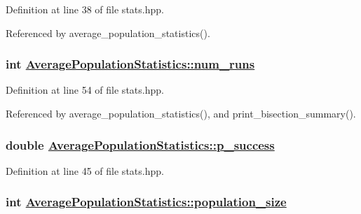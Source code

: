 Definition at line 38 of file stats.hpp.

Referenced by average\_\-population\_\-statistics().\hypertarget{struct_average_population_statistics_e4f9ec7ed6bc9f924fa740a141478797}{
\subsubsection[num\_\-runs]{\setlength{\rightskip}{0pt plus 5cm}int \hyperlink{struct_average_population_statistics_e4f9ec7ed6bc9f924fa740a141478797}{Average\-Population\-Statistics::num\_\-runs}}}
\label{struct_average_population_statistics_e4f9ec7ed6bc9f924fa740a141478797}




Definition at line 54 of file stats.hpp.

Referenced by average\_\-population\_\-statistics(), and print\_\-bisection\_\-summary().\hypertarget{struct_average_population_statistics_186c0b9123aaeb087bac7a5acbd2e4e3}{
\subsubsection[p\_\-success]{\setlength{\rightskip}{0pt plus 5cm}double \hyperlink{struct_average_population_statistics_186c0b9123aaeb087bac7a5acbd2e4e3}{Average\-Population\-Statistics::p\_\-success}}}
\label{struct_average_population_statistics_186c0b9123aaeb087bac7a5acbd2e4e3}




Definition at line 45 of file stats.hpp.\hypertarget{struct_average_population_statistics_489a8d8acbd86a92f5e43ee2a2016222}{
\subsubsection[population\_\-size]{\setlength{\rightskip}{0pt plus 5cm}int \hyperlink{struct_average_population_statistics_489a8d8acbd86a92f5e43ee2a2016222}{Average\-Population\-Statistics::population\_\-size}}}
\label{struct_average_population_statistics_489a8d8acbd86a92f5e43ee2a2016222}




